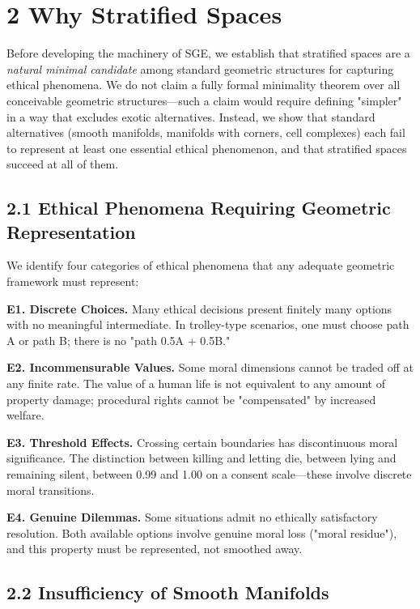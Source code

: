 \documentclass[12pt]{article}
\theoremstyle{plain}
\theoremstyle{definition}
\theoremstyle{remark}
\begin{document}
\section{2 Why Stratified Spaces}\label{why-stratified-spaces}

Before developing the machinery of SGE, we establish that stratified
spaces are a \emph{natural minimal candidate} among standard geometric
structures for capturing ethical phenomena. We do not claim a fully
formal minimality theorem over all conceivable geometric
structures---such a claim would require defining "simpler" in a way that
excludes exotic alternatives. Instead, we show that standard
alternatives (smooth manifolds, manifolds with corners, cell complexes)
each fail to represent at least one essential ethical phenomenon, and
that stratified spaces succeed at all of them.

\subsection{2.1 Ethical Phenomena Requiring Geometric
Representation}\label{ethical-phenomena-requiring-geometric-representation}

We identify four categories of ethical phenomena that any adequate
geometric framework must represent:

\textbf{E1. Discrete Choices.} Many ethical decisions present finitely
many options with no meaningful intermediate. In trolley-type scenarios,
one must choose path A or path B; there is no "path 0.5A + 0.5B."

\textbf{E2. Incommensurable Values.} Some moral dimensions cannot be
traded off at any finite rate. The value of a human life is not
equivalent to any amount of property damage; procedural rights cannot be
"compensated" by increased welfare.

\textbf{E3. Threshold Effects.} Crossing certain boundaries has
discontinuous moral significance. The distinction between killing and
letting die, between lying and remaining silent, between 0.99 and 1.00
on a consent scale---these involve discrete moral transitions.

\textbf{E4. Genuine Dilemmas.} Some situations admit no ethically
satisfactory resolution. Both available options involve genuine moral
loss ("moral residue"), and this property must be represented, not
smoothed away.

\subsection{2.2 Insufficiency of Smooth
Manifolds}\label{insufficiency-of-smooth-manifolds}
\end{document}
